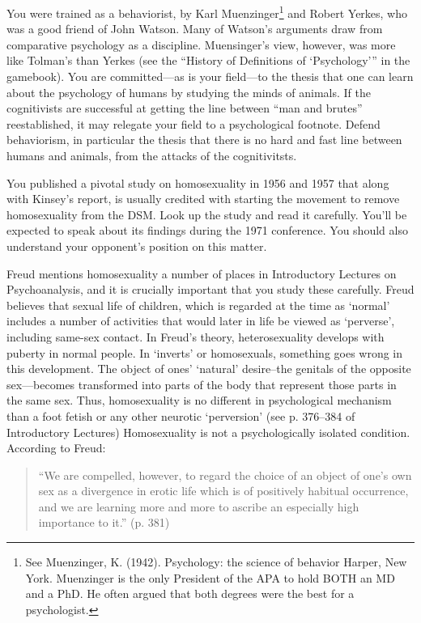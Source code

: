 You were trained as a behaviorist, by Karl Muenzinger\footnote{See Muenzinger, K. (1942). Psychology: the science of behavior Harper, New York. Muenzinger is the only President of the APA to hold BOTH an MD and a PhD. He often argued that both degrees were the best for a psychologist.} and Robert Yerkes, who was a good friend of John Watson. Many of Watson's arguments draw from comparative psychology as a discipline. Muensinger's view, however, was more like Tolman's than Yerkes (see the ``History of Definitions of `Psychology''' in the gamebook). You are committed---as is your field---to the thesis that one can learn about the psychology of humans by studying the minds of animals. If the cognitivists are successful at getting the line between ``man and brutes'' reestablished, it may relegate your field to a psychological footnote. Defend behaviorism, in particular the thesis that there is no hard and fast line between humans and animals, from the attacks of the cognitivitsts.

You published a pivotal study on homosexuality in 1956 and 1957 that along with Kinsey's report, is usually credited with starting the movement to remove homosexuality from the DSM. Look up the study and read it carefully. You'll be expected to speak about its findings during the 1971 conference. You should also understand your opponent's position on this matter.

Freud mentions homosexuality a number of places in Introductory Lectures on Psychoanalysis, and it is crucially important that you study these carefully. Freud believes that sexual life of children, which is regarded at the time as `normal' includes a number of activities that would later in life be viewed as `perverse', including same-sex contact. In Freud's theory, heterosexuality develops with puberty in normal people. In `inverts' or homosexuals, something goes wrong in this development. The object of ones' `natural' desire--the genitals of the opposite sex---becomes transformed into parts of the body that represent those parts in the same sex. Thus, homosexuality is no different in psychological mechanism than a foot fetish or any other neurotic `perversion' (see p. 376--384 of Introductory Lectures) Homosexuality is not a psychologically isolated condition. According to Freud:

\begin{quote}

``We are compelled, however, to regard the choice of an object of one's own sex as a divergence in erotic life which is of positively habitual occurrence, and we are learning more and more to ascribe an especially high importance to it.'' (p. 381)
\end{quote}

